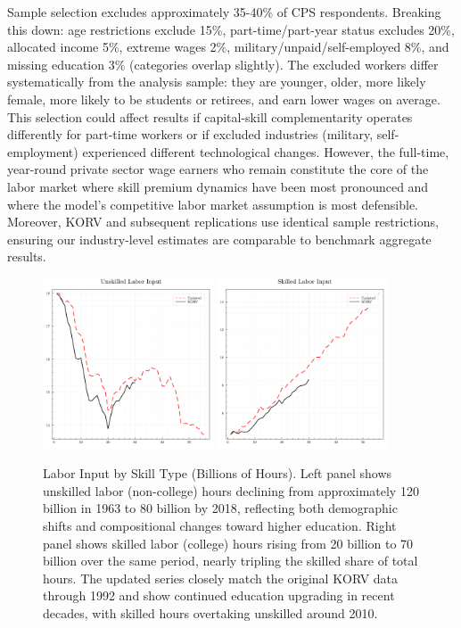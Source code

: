\documentclass[12pt]{article}
\begin{document}
Sample selection excludes approximately 35-40\% of CPS respondents. Breaking this down: age restrictions exclude 15\%, part-time/part-year status excludes 20\%, allocated income 5\%, extreme wages 2\%, military/unpaid/self-employed 8\%, and missing education 3\% (categories overlap slightly). The excluded workers differ systematically from the analysis sample: they are younger, older, more likely female, more likely to be students or retirees, and earn lower wages on average. This selection could affect results if capital-skill complementarity operates differently for part-time workers or if excluded industries (military, self-employment) experienced different technological changes. However, the full-time, year-round private sector wage earners who remain constitute the core of the labor market where skill premium dynamics have been most pronounced and where the model's competitive labor market assumption is most defensible. Moreover, KORV and subsequent replications use identical sample restrictions, ensuring our industry-level estimates are comparable to benchmark aggregate results.

\begin{figure}[H]
 \centering
 \includegraphics[width=0.45\textwidth]{../images/labor_input_unskilled_doc.pdf}
 \hspace*{0.05\textwidth}
 \includegraphics[width=0.45\textwidth]{../images/labor_input_skilled_doc.pdf}
 \caption{\label{fig:labor_series_1} Labor Input by Skill Type (Billions of Hours). Left panel shows unskilled labor (non-college) hours declining from approximately 120 billion in 1963 to 80 billion by 2018, reflecting both demographic shifts and compositional changes toward higher education. Right panel shows skilled labor (college) hours rising from 20 billion to 70 billion over the same period, nearly tripling the skilled share of total hours. The updated series closely match the original KORV data through 1992 and show continued education upgrading in recent decades, with skilled hours overtaking unskilled around 2010.}
\end{figure}
\end{document}
